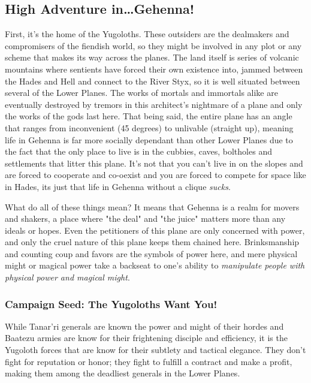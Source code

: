 \subsection{High Adventure in\ldots Gehenna!}

First, it's the home of the Yugoloths. These outsiders are the dealmakers and compromisers of the fiendish world, so they might be involved in any plot or any scheme that makes its way across the planes. The land itself is series of volcanic mountains where sentients have forced their own existence into, jammed between the Hades and Hell and connect to the River Styx, so it is well situated between several of the Lower Planes. The works of mortals and immortals alike are eventually destroyed by tremors in this architect's nightmare of a plane and only the works of the gods last here. That being said, the entire plane has an angle that ranges from inconvenient (45 degrees) to unlivable (straight up), meaning life in Gehenna is far more socially dependant than other Lower Planes due to the fact that the only place to live is in the cubbies, caves, boltholes and settlements that litter this plane. It's not that you can't live in on the slopes and are forced to cooperate and co-oexist and you are forced to compete for space like in Hades, its just that life in Gehenna without a clique \textit{sucks}.

What do all of these things mean? It means that Gehenna is a realm for movers and shakers, a place where "the deal" and "the juice" matters more than any ideals or hopes. Even the petitioners of this plane are only concerned with power, and only the cruel nature of this plane keeps them chained here. Brinksmanship and counting coup and favors are the symbols of power here, and mere physical might or magical power take a backseat to one's ability to \textit{manipulate people with physical power and magical might}.

\subsubsection{Campaign Seed: The Yugoloths Want You!}

While Tanar'ri generals are known the power and might of their hordes and Baatezu armies are know for their frightening disciple and efficiency, it is the Yugoloth forces that are know for their subtlety and tactical elegance. They don't fight for reputation or honor; they fight to fulfill a contract and make a profit, making them among the deadliest generals in the Lower Planes.

